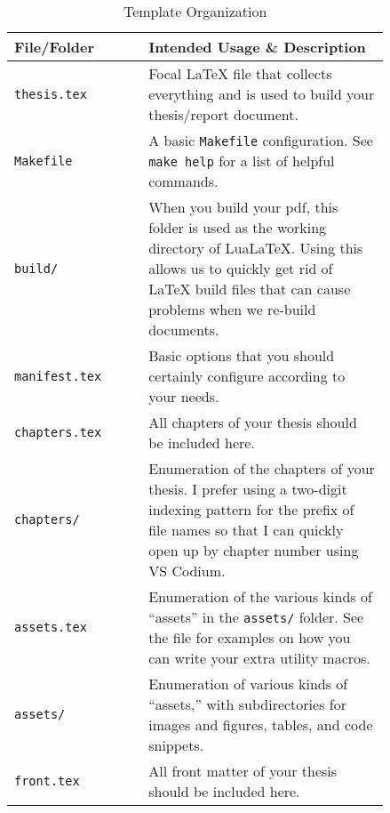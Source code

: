 \begin{longtable}[c]{|>{\raggedright}p{0.3\linewidth}|>{\raggedright\arraybackslash}p{0.54\linewidth}|}
    \caption{Template Organization}
    \label{tab:organization}                                              \\

    \hline

    \rowcolor{McMasterMediumGrey}
    \textbf{File/Folder}     & \textbf{Intended Usage \& Description}
    \\ \hline

    \texttt{thesis.tex} & Focal \LaTeX{} file that collects everything and is
    used to build your thesis/report document.
    \\ \hline

    \texttt{Makefile} & A basic \texttt{Makefile} configuration. See
    \texttt{make help} for a list of helpful commands. \\ \hline

    \texttt{build/} & When you build your \acs{pdf}, this folder is used as the
    working directory of LuaLaTeX. Using this allows us to quickly get rid of
    \LaTeX{} build files that can cause problems when we re-build documents. \\
    \hline

    \texttt{manifest.tex} & Basic options that you should certainly configure
    according to your needs.
    \\ \hline

    \texttt{chapters.tex} & All chapters of your thesis should be included here.
    \\ \hline

    \texttt{chapters/} & Enumeration of the chapters of your thesis. I prefer
    using a two-digit indexing pattern for the prefix of file names so that I
    can quickly open up by chapter number using VS Codium. \\ \hline

    \texttt{assets.tex} & Enumeration of the various kinds of ``assets'' in the
    \texttt{assets/} folder. See the file for examples on how you can write your
    extra utility macros. \\ \hline

    \texttt{assets/} & Enumeration of various kinds of ``assets,'' with
    subdirectories for images and figures, tables, and code snippets. \\ \hline

    \texttt{front.tex} & All front matter of your thesis should be included
    here. \\ \hline


\end{longtable}
